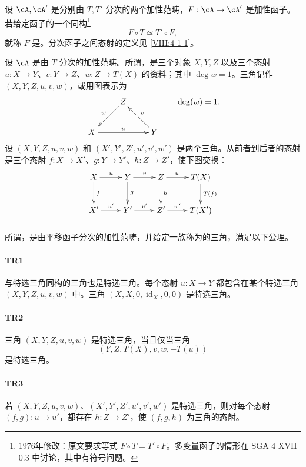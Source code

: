 设 $\cA,\cA'$ 是分别由 $T,T'$ 分次的两个加性范畴，$F:\cA\to\cA'$ 是加性函子。若给定函子的一个同构\footnote{1976年修改：原文要求等式 $F\circ T=T'\circ F$。多变量函子的情形在 SGA 4 XVII 0.3 中讨论，其中有符号问题。}
\[
 F\circ T\simeq T'\circ F,
\]
就称 $F$ 是。分次函子之间态射的定义见 \ref{VIII:4-1-1}。

设 $\cA$ 是由 $T$ 分次的加性范畴。所谓，是三个对象 $X,Y,Z$ 以及三个态射 $u:X\to Y$、$v:Y\to Z$、$w:Z\to T(X)$ 的资料；其中 $\deg w=1$。三角记作 $(X,Y,Z,u,v,w)$，或用图表示为
\[\xymatrix{
 &Z\ar[dl]_-w\\
 X\ar[rr]^-u&&Y\ar[lu]_-v
}\qquad\deg(w)=1.
\]
设 $(X,Y,Z,u,v,w)$ 和 $(X',Y',Z',u',v',w')$ 是两个三角。从前者到后者的态射是三个态射 $f:X\to X'$、$g:Y\to Y'$、$h:Z\to Z'$，使下图交换：
\[\xymatrix{
 X\ar[r]^-u\ar[d]^-f&Y\ar[r]^-v\ar[d]^-g&Z\ar[r]^-w\ar[d]^-h&T(X)\ar[d]^-{T(f)}\\
 X'\ar[r]^-{u'}&Y'\ar[r]^-{v'}&Z'\ar[r]^-{w'}&T(X')
}\]
\subsubsection{}\label{VIII:1-1-1}
所谓，是由平移函子分次的加性范畴，并给定一族称为的三角，满足以下公理。
\paragraph{TR1}\hypertarget{VIII:TR1}{}
与特选三角同构的三角也是特选三角。每个态射 $u:X\to Y$ 都包含在某个特选三角 $(X,Y,Z,u,v,w)$ 中。三角 $(X,X,0,\operatorname{id}_X,0,0)$ 是特选三角。
\paragraph{TR2}\hypertarget{VIII:TR2}{}
三角 $(X,Y,Z,u,v,w)$ 是特选三角，当且仅当三角
\[(Y,Z,T(X),v,w,-T(u))\]
是特选三角。
\paragraph{TR3}\hypertarget{VIII:TR3}{}
若 $(X,Y,Z,u,v,w)$、$(X',Y',Z',u',v',w')$ 是特选三角，则对每个态射 $(f,g):u\to u'$，都存在 $h:Z\to Z'$，使 $(f,g,h)$ 为三角的态射。
